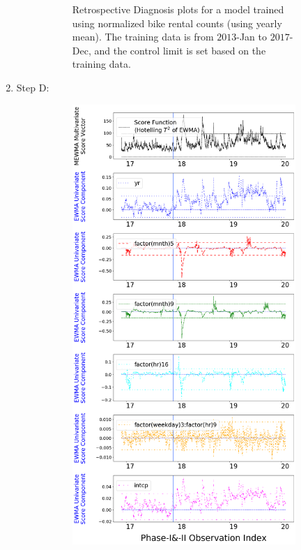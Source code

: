 \documentclass[twoside,11pt]{article}
\begin{document}
\begin{enumerate}
\begin{figure}[H]
\begin{subfigure}[t]{0.32\linewidth}
     \captionsetup{width=.95\linewidth}
     \caption{Retrospective Diagnosis plots for a model trained using normalized bike rental counts (using yearly mean). The training data is from $2013$-Jan to $2017$-Dec, and the control limit is set based on the training data.}
     \label{fig:bs_raw_cnt_2}
\end{subfigure}
\caption{
}
\label{fig:bike_sharing_diag}
\end{figure}

\item Step D:

\begin{figure}[H]
\centering
    \begin{subfigure}[t]{0.32\linewidth}
     \centering
         \includegraphics[width=1.0\textwidth, trim=.0in .0in .0in .0in, clip]{../figures/v14/bike_sharing/reg_lin_D/neg_single_bike_fisher_mlines_with_regu_1e-08_0_0001_0_01_99_99.png}

\end{subfigure}
\end{figure}
\end{enumerate}
\end{document}

